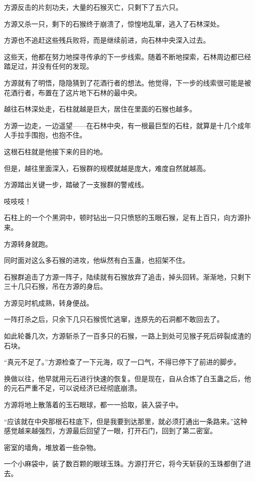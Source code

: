 \begin{this_body}
方源反击的片刻功夫，大量的石猴灭亡，只剩下了五六只。

方源又杀一只，剩下的石猴终于崩溃了，惊惶地乱窜，逃入了石林深处。

方源也不追赶这些残兵败将，而是继续前进，向石林中央深入过去。

这些天，他都在努力地探寻传承的下一步线索。随着不断地探索，石林周边都已经踏足过，并没有任何的发现。

方源就有了明悟，隐隐猜到了花酒行者的想法。他觉得，下一步的线索很可能是被花酒行者，布置在了这片地下石林的最中央。

越往石林深处走，石柱就越是巨大，居住在里面的石猴也越多。

方源一边走，一边遥望——在石林中央，有一根最巨型的石柱，就算是十几个成年人手拉手围抱，也抱不住。

这根石柱就是他接下来的目的地。

但是，越往里面深入，石猴群的规模就越是庞大，难度自然就越高。

方源踏出关键一步，踏破了一支猴群的警戒线。

吱吱吱！

石柱上的一个个黑洞中，顿时钻出一只只愤怒的玉眼石猴，足有上百只，向方源扑来。

方源转身就跑。

同时面对这么多石猴的进攻，他纵然有白玉蛊，也招架不住。

石猴群追击了方源一阵子，陆续就有石猴放弃了追击，掉头回转。渐渐地，只剩下三十几只石猴，吊在方源的身后。

方源见时机成熟，转身便战。

一阵打杀之后，只余下几只石猴慌忙逃窜，连原先的石洞都不敢回去了。

如此轮番几次，方源斩杀了一百多只的石猴，一路上到处可见猴子死后碎裂成渣的石块。

“真元不足了。”方源检查了一下元海，叹了一口气，不得已停下了前进的脚步。

换做以往，他早就用元石进行快速的恢复。但是现在，自从合炼了白玉蛊之后，他的元石严重不足，可以说经济已经彻底崩溃。

方源将地上散落着的玉石眼球，都一一拾取，装入袋子中。

“应该就在中央那根石柱底下，但是我要到达那里，就必须打通出一条路来。”这种感觉越来越强烈，方源最后回望了一眼，打开石门，回到了第二密室。

密室的墙角，堆放着一些杂物。

一个小麻袋中，装了数百颗的眼球玉珠。方源打开它，将今天斩获的玉珠都倒了进去。


\end{this_body}
